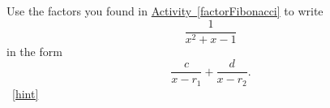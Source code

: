 \documentclass{book}
\begin{document}
\setcounter{project}{268}
\addtocounter{project}{-1}
\begin{activity}[]\label{fractionFibonacci}
\hypertarget{p-1408}{}%
Use the factors you found in \hyperref[factorFibonacci]{Activity~\ref{factorFibonacci}} to write%
\begin{equation*}
\frac{1}{x^2+x-1}
\end{equation*}
in the form%
\begin{equation*}
\frac{c}{x-r_1} + \frac{d}{x-r_2}.
\end{equation*}
%
~\hfill{\tiny\hyperlink{a-268}{[hint]}\hypertarget{q-268}{}}\end{activity}
\end{document}
